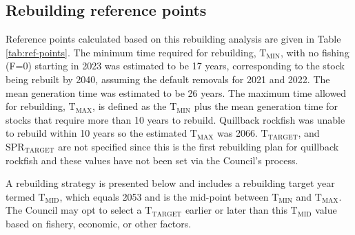 \documentclass[11pt,
  english,
  letterpaper,
]{article}
\begin{document}
\leavevmode\tagmcend\tagstructend


\hypertarget{rebuilding-reference-points}{%
\subsection{Rebuilding reference points}\label{rebuilding-reference-points}}

\leavevmode\tagmcend\tagstructend


Reference points calculated based on this rebuilding analysis are given in Table \ref{tab:ref-points}. The minimum time required for rebuilding, {\(\text{T}_\text{MIN}\)\leavevmode\tagmcend\tagstructend}, with no fishing (F=0) starting in 2023 was estimated to be 17 years, corresponding to the stock being rebuilt by 2040, assuming the default removals for 2021 and 2022. The mean generation time was estimated to be 26 years. The maximum time allowed for rebuilding, {\(\text{T}_\text{MAX}\)\leavevmode\tagmcend\tagstructend}, is defined as the {\(\text{T}_\text{MIN}\)\leavevmode\tagmcend\tagstructend} plus the mean generation time for stocks that require more than 10 years to rebuild. Quillback rockfish was unable to rebuild within 10 years so the estimated {\(\text{T}_\text{MAX}\)\leavevmode\tagmcend\tagstructend} was 2066. {\(\text{T}_\text{TARGET}\)\leavevmode\tagmcend\tagstructend}, and {\(\text{SPR}_\text{TARGET}\)\leavevmode\tagmcend\tagstructend} are not specified since this is the first rebuilding plan for quillback rockfish and these values have not been set via the Council's process.

\leavevmode\tagmcend\tagstructend\par


A rebuilding strategy is presented below and includes a rebuilding target year termed {\(\text{T}_\text{MID}\)\leavevmode\tagmcend\tagstructend}, which equals 2053 and is the mid-point between {\(\text{T}_\text{MIN}\)\leavevmode\tagmcend\tagstructend} and {\(\text{T}_\text{MAX}\)\leavevmode\tagmcend\tagstructend}. The Council may opt to select a {\(\text{T}_\text{TARGET}\)\leavevmode\tagmcend\tagstructend} earlier or later than this {\(\text{T}_\text{MID}\)\leavevmode\tagmcend\tagstructend} value based on fishery, economic, or other factors.
\end{document}
